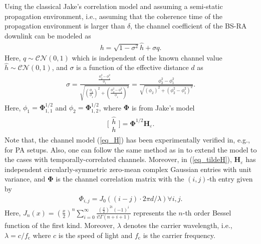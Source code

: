 Using the classical Jake's correlation model \cite[p. 2642]{Shin2003TITcapacity} and  assuming a semi-static propagation environment, i.e., assuming that the coherence time of the propagation environment is larger than $\delta$,  the channel coefficient of the BS-RA downlink can be modeled as 
\begin{align}\label{eq_H}
    h = \sqrt{1-\sigma^2} \hat{h} + \sigma q.
\end{align}
Here, $q \sim \mathcal{CN}(0,1)$ which is independent of the known channel value $\hat{h}\sim \mathcal{CN}(0,1)$, and $\sigma$ is a function of the effective distance $d$ as 
\begin{align}
    \sigma = \frac{\frac{\phi_2^2-\phi_1^2}{\phi_1}}{\sqrt{ \left(\frac{\phi_2}{\phi_1}\right)^2 + \left(\frac{\phi_2^2-\phi_1^2}{\phi_1}\right)^2 }} = \frac{\phi_2^2-\phi_1^2}{\sqrt{ \left(\phi_2\right)^2 + \left(\phi_2^2-\phi_1^2\right)^2 }} .
\end{align}
Here, $\phi_1 = \bm{\Phi}_{1,1}^{1/2} $ and $\phi_2 = \bm{\Phi}_{1,2}^{1/2} $, where $\bm{\Phi}$ is  from Jake's model \cite[p. 2642]{Shin2003TITcapacity}
\begin{align}\label{eq_tildeH}
     \bigl[ \begin{smallmatrix}
  \hat{h}\\h
\end{smallmatrix} \bigr]= \bm{\Phi}^{1/2} \bm{H}_{\varepsilon}.
\end{align}
Note that, the channel model (\ref{eq_H}) has been experimentally verified in, e.g., \cite{Jamaly2014EuCAPanalysis} for PA setups. Also, one can follow the same method as in \cite{Guo2019WCLrate} to extend the model to the cases with temporally-correlated channels. Moreover, in (\ref{eq_tildeH}), $\bm{H}_{\varepsilon}$ has independent circularly-symmetric zero-mean complex Gaussian entries with unit variance, and $\bm{\Phi}$ is the channel correlation matrix with the $(i,j)$-th entry given by
\begin{align}\label{eq_phi}
    \Phi_{i,j} = J_0\left((i-j)\cdot2\pi d/ \lambda\right) \forall i,j.
\end{align}
Here, $J_n(x) = (\frac{x}{2})^n \sum_{i=0}^{\infty}\frac{(\frac{x}{2})^{2i}(-1)^{i} }{i!\Gamma(n+i+1)}$ represents the $n$-th order Bessel function of the first kind. Moreover, $\lambda$ denotes the carrier wavelength, i.e., $\lambda = c/f_\text{c}$ where $c$ is the speed of light and $f_\text{c}$ is the carrier frequency. 







